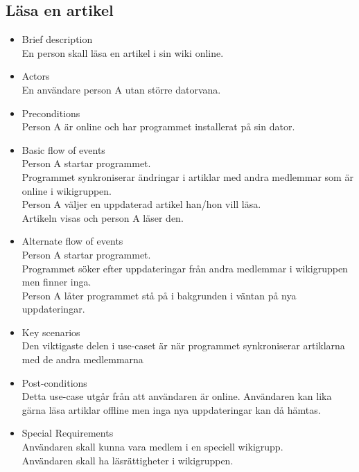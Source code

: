 \subsection{Läsa en artikel}
\begin{itemize}
	\item Brief description
	\\En person skall läsa en artikel i sin wiki online.
	\item Actors
	\\En användare person A utan större datorvana.
	\item Preconditions
	\\Person A är online och har programmet installerat på sin dator.
	\item Basic flow of events
	\\Person A startar programmet.
	\\Programmet synkroniserar ändringar i artiklar med andra medlemmar som är online i wikigruppen.
	\\Person A väljer en uppdaterad artikel han/hon vill läsa.
	\\Artikeln visas och person A läser den.
	\item Alternate flow of events
	\\Person A startar programmet.
	\\Programmet söker efter uppdateringar från andra medlemmar i wikigruppen men finner inga.
	\\Person A låter programmet stå på i bakgrunden i väntan på nya uppdateringar.	
	\item Key scenarios
	\\Den viktigaste delen i use-caset är när programmet synkroniserar artiklarna med de andra medlemmarna
	\item Post-conditions
	\\Detta use-case utgår från att användaren är online. Användaren kan lika gärna läsa artiklar offline men inga nya uppdateringar kan då hämtas.
	\item Special Requirements
	\\Användaren skall kunna vara medlem i en speciell wikigrupp.
	\\Användaren skall ha läsrättigheter i wikigruppen.
\end{itemize}

